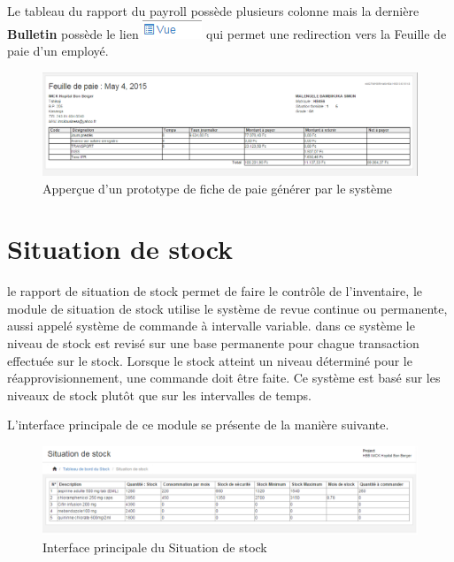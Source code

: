 \documentclass[12pt,a4paper]{report}
\begin{document}
Le tableau du rapport du payroll possède plusieurs colonne mais la dernière \textbf{Bulletin} possède le lien \includegraphics[scale=0.7]{pic/VuePaieSlip.png} qui permet une redirection vers la Feuille de paie d'un employé.

\begin{figure}[h]
\begin{center}
\includegraphics[width=14cm]{pic/FeuillePaie.png}
\end{center}
\caption{Apperçue d'un prototype de fiche de paie générer par le système}
\label{Apperçue d'un prototype de fiche de paie générer par le système}
\end{figure}

\newpage
\section{Situation de stock}
le rapport de situation de stock permet de faire le contrôle de l'inventaire, le module de situation de stock utilise le système de revue continue ou permanente, aussi appelé système de commande à intervalle variable. dans ce système le niveau de stock est revisé sur une base permanente pour chague transaction effectuée sur le stock. Lorsque le stock atteint un niveau déterminé pour le réapprovisionnement, une commande doit être faite. Ce système est basé sur les niveaux de stock plutôt que sur les intervalles de temps.

L'interface principale de ce module se présente de la manière suivante.

\begin{figure}[h]
\begin{center}
\includegraphics[width=14cm]{pic/SituationStock.png}
\end{center}
\caption{Interface principale du Situation de stock}
\label{Interface principale du Situation de stock}
\end{figure}
\end{document}
